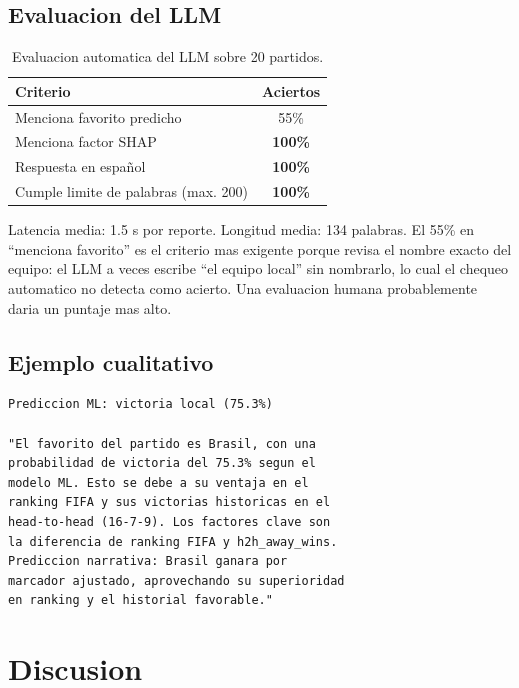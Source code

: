 \documentclass[10pt,twocolumn]{article}
\begin{document}
\subsection{Evaluacion del LLM}

\begin{table}[H]
\centering
\caption{Evaluacion automatica del LLM sobre 20 partidos.}
\label{tab:llm}
\begin{tabular}{lc}
\toprule
\textbf{Criterio} & \textbf{Aciertos} \\
\midrule
Menciona favorito predicho             & 55\% \\
Menciona factor SHAP                   & \textbf{100\%} \\
Respuesta en español                   & \textbf{100\%} \\
Cumple limite de palabras (max. 200)  & \textbf{100\%} \\
\bottomrule
\end{tabular}
\end{table}

Latencia media: 1.5 s por reporte. Longitud media: 134 palabras. El 55\% en ``menciona favorito'' es el criterio mas exigente porque revisa el nombre exacto del equipo: el LLM a veces escribe ``el equipo local'' sin nombrarlo, lo cual el chequeo automatico no detecta como acierto. Una evaluacion humana probablemente daria un puntaje mas alto.

\subsection{Ejemplo cualitativo}

\begin{lstlisting}[caption={Reporte LLM para Brasil vs Argentina, Copa America 2021.}, basicstyle=\ttfamily\tiny]
Prediccion ML: victoria local (75.3%)

"El favorito del partido es Brasil, con una
probabilidad de victoria del 75.3% segun el
modelo ML. Esto se debe a su ventaja en el
ranking FIFA y sus victorias historicas en el
head-to-head (16-7-9). Los factores clave son
la diferencia de ranking FIFA y h2h_away_wins.
Prediccion narrativa: Brasil ganara por
marcador ajustado, aprovechando su superioridad
en ranking y el historial favorable."
\end{lstlisting}

\section{Discusion}
\label{sec:disc}
\end{document}
